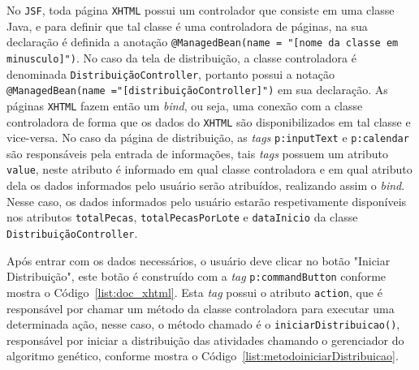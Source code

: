 \par No \texttt{JSF}, toda página \texttt{XHTML} possui um controlador que
consiste em uma classe Java, e para definir que tal classe é uma controladora de páginas, na sua declaração é definida a anotação \texttt{@ManagedBean(name = "[nome da classe em minusculo]")}.
No caso da tela de distribuição, a classe controladora é denominada
\texttt{DistribuiçãoContro\-ller}, portanto possui a notação
\texttt{@ManagedBean(name ="[distribuiçãoControlle\-r]")} em sua declaração. As
páginas \texttt{XHTML} fazem então um \textit{bind}, ou seja, uma conexão com a classe controladora de forma que os dados do \texttt{XHTML} são disponibilizados em tal classe e vice-versa.
No caso da página de distribuição, as \textit{tags} \texttt{p:inputText} e \texttt{p:calendar} são responsáveis pela entrada de 
informações, tais \textit{tags} possuem um atributo \texttt{value}, neste atributo é informado em qual classe controladora e em qual 
atributo dela os dados informados pelo usuário serão atribuídos, realizando assim o \textit{bind}. Nesse caso, os dados informados pelo 
usuário estarão respetivamente disponíveis nos atributos \texttt{totalPecas}, \texttt{totalPecasPorLote} e \texttt{dataInicio} da
classe \texttt{DistribuiçãoContro\-ller}.

\par Após entrar com os dados necessários, o usuário deve clicar no botão "Iniciar Distribuição", este botão é construído com a
\textit{tag} \texttt{p:commandButton} conforme mostra o Código~\ref{list:doc_xhtml}. Esta \textit{tag} possui o atributo \texttt{action}, que 
é responsável por chamar um método da classe controladora para executar uma determinada ação, nesse caso, o método chamado é o 
\texttt{iniciarDistribuicao()}, responsável por iniciar a distribuição das atividades chamando o gerenciador do algoritmo genético, 
conforme mostra o Código~\ref{list:metodoiniciarDistribuicao}.

